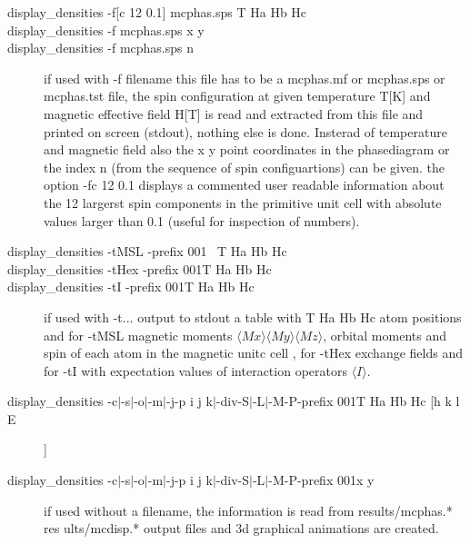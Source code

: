 \begin{description} 
\item[ display\_densities -f{[c 12 0.1]} mcphas.sps T Ha Hb Hc]
\item[ display\_densities -f mcphas.sps x y]
\item[ display\_densities -f mcphas.sps n]
 if used with -f filename this file has to be a mcphas.mf or mcphas.sps or mcphas.tst file,
the spin configuration
   at given temperature T[K] and magnetic effective field H[T]
    is read and extracted from this file and printed on screen (stdout), nothing
 else is done. Insterad of temperature and magnetic field also the x y point coordinates
in the phasediagram or the index n (from the sequence of spin configuartions) can be given.
the option -fc 12 0.1 displays a commented user readable information about the 12 largerst
spin components in the primitive unit cell with absolute values larger than 0.1 (useful for
inspection of numbers).
\item[ display\_densities -tMSL \lbrack -prefix 001 \rbrack\, T Ha Hb Hc]
\item[ display\_densities -tHex \lbrack-prefix 001\rbrack T Ha Hb Hc]
\item[ display\_densities -tI \lbrack-prefix 001\rbrack T Ha Hb Hc]
 if used with -t... output to stdout a table with T Ha Hb Hc atom positions and
for -tMSL 
              magnetic moments $\langle Mx \rangle \langle My \rangle \langle Mz \rangle$, orbital moments and spin 
              of each atom in the magnetic unitc cell , for 
       -tHex  exchange fields and for 
       -tI    with expectation values of interaction operators $\langle I \rangle$.

\item[display\_densities \lbrack-c$|$-s$|$-o$|$-m$|$-j\rbrack \lbrack -p i j k$|$-div\rbrack \lbrack -S$|$-L$|$-M\rbrack \lbrack -P\rbrack \lbrack -prefix 001\rbrack T Ha Hb Hc [h k l E]]
\item[display\_densities \lbrack-c$|$-s$|$-o$|$-m$|$-j\rbrack \lbrack -p i j k$|$-div\rbrack \lbrack -S$|$-L$|$-M\rbrack \lbrack -P\rbrack \lbrack -prefix 001\rbrack  x y]
 if used without a filename, the information is read from results/mcphas.* res
ults/mcdisp.*
   output files and 3d graphical animations are created.
\end{description} 
